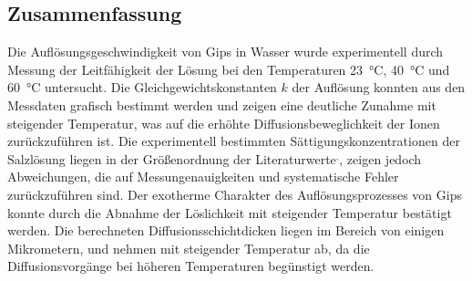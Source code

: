 \subsection{Zusammenfassung}
Die Auflösungsgeschwindigkeit von Gips in Wasser wurde experimentell durch Messung der Leitfähigkeit der Lösung bei den Temperaturen \qty{23}{\degreeCelsius}, \qty{40}{\degreeCelsius} und \qty{60}{\degreeCelsius} untersucht.
Die Gleichgewichtskonstanten $k$ der Auflösung konnten aus den Messdaten grafisch bestimmt werden und zeigen eine deutliche Zunahme mit steigender Temperatur, was auf die erhöhte Diffusionsbeweglichkeit der Ionen zurückzuführen ist.
Die experimentell bestimmten Sättigungskonzentrationen der Salzlösung liegen in der Größenordnung der Literaturwerte\autocite{Raupenstrauch1885-ng}$^,$\autocite{partridge1929solubility}, zeigen jedoch Abweichungen, die auf Messungenauigkeiten und systematische Fehler zurückzuführen sind.
Der exotherme Charakter des Auflösungsprozesses von Gips konnte durch die Abnahme der Löslichkeit mit steigender Temperatur bestätigt werden.
Die berechneten Diffusionsschichtdicken liegen im Bereich von einigen Mikrometern, und nehmen mit steigender Temperatur ab, da die Diffusionsvorgänge bei höheren Temperaturen begünstigt werden.

